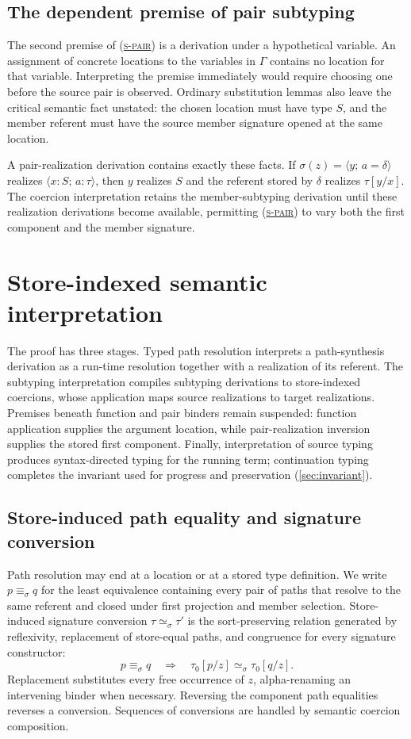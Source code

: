 \documentclass[acmsmall,screen,nonacm]{acmart}
\newcommand{\ruleref}[1]{%
  \textsc{(\hyperref[rule:#1]{#1})}}
\newcommand{\pairty}[4]{\langle #1\!:\!#2;\,#3\!:\!#4\rangle}
\newcommand{\pairval}[3]{\langle #1;\,#2=#3\rangle}
\newcommand{\subst}[3]{#1[#2/#3]}
\begin{document}
\subsection{The dependent premise of pair subtyping}

The second premise of \ruleref{s-pair} is a derivation under a hypothetical
variable. An assignment of concrete locations to the variables in \(\Gamma\)
contains no location for that variable. Interpreting the premise immediately
would require choosing one before the source pair is observed. Ordinary
substitution lemmas also leave the critical semantic fact unstated: the
chosen location must have type \(S\), and the member referent must have the
source member signature opened at the same location.

A pair-realization derivation contains exactly these facts. If
\(\sigma(z)=\pairval{y}{a}{\delta}\) realizes
\(\pairty{x}{S}{a}{\tau}\), then \(y\) realizes \(S\) and the referent stored
by \(\delta\) realizes \(\tau[y/x]\). The coercion interpretation retains the
member-subtyping derivation until these realization derivations become
available, permitting \ruleref{s-pair} to vary both the first component and the member
signature.

\section{Store-indexed semantic interpretation}
\label{sec:coercions}

The proof has three stages. Typed path resolution interprets a path-synthesis
derivation as a run-time resolution together with a realization of its
referent. The subtyping interpretation compiles subtyping derivations to
store-indexed coercions, whose application maps source realizations to target
realizations. Premises beneath function and pair binders remain suspended:
function application supplies the argument location, while pair-realization
inversion supplies the stored first component. Finally, interpretation of
source typing produces syntax-directed typing for the running term;
continuation typing completes the invariant used for progress and
preservation (\cref{sec:invariant}).

\subsection{Store-induced path equality and signature conversion}

Path resolution may end at a location or at a stored type definition. We
write \(p\equiv_\sigma q\) for the least equivalence containing every pair
of paths that resolve to the same referent and closed under first projection
and member selection. Store-induced signature conversion
\(\tau\simeq_\sigma\tau'\) is the sort-preserving relation generated by
reflexivity, replacement of store-equal paths, and congruence for every
signature constructor:
\[
  p\equiv_\sigma q
  \quad\Longrightarrow\quad
  \subst{\tau_0}{p}{z}\simeq_\sigma\subst{\tau_0}{q}{z}.
\]
Replacement substitutes every free occurrence of \(z\), alpha-renaming an
intervening binder when necessary. Reversing the component path equalities
reverses a conversion. Sequences of conversions are handled by semantic
coercion composition.
\end{document}
